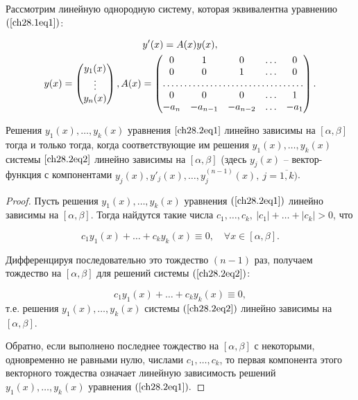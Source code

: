 Рассмотрим линейную однородную систему, которая эквивалентна уравнению $(\ref{ch28.1eq1})$:

\begin{multline} \label{ch28.2eq2}
y'(x) = A(x)y(x), \\
y(x) = \begin{pmatrix}
y_1(x) \\
\vdots \\
y_n(x)
\end{pmatrix},
A(x) = \begin{pmatrix}
0 & 1 & 0 & \ldots & 0 \\
0 & 0 & 1 & \ldots & 0 \\
\hdotsfor{5} \\
0 & 0 & 0 & \ldots & 1 \\
-a_n & -a_{n - 1} & -a_{n - 2} & \ldots & -a_1
\end{pmatrix}.
\end{multline}

\begin{lemm} \label{ch28.2lemm1}
Решения $y_1(x), \ldots, y_k(x)$ уравнения $\ref{ch28.2eq1}$ линейно зависимы на $[\alpha, \beta]$ тогда и только тогда, когда соответствующие им решения $y_1(x), \ldots, y_k(x)$ системы $\ref{ch28.2eq2}$ линейно зависимы на $[\alpha,\beta]$ (здесь $y_j(x)$ -- вектор-функция с компонентами $y_j(x), y'_j(x), \ldots, y^{(n - 1)}_j(x), \: j = \overline{1,k})$.
\end{lemm}

\begin{proof}
Пусть решения $y_1(x), \ldots, y_k(x)$ уравнения $(\ref{ch28.2eq1})$ линейно зависимы на $[\alpha, \beta]$. Тогда найдутся такие числа $c_1, \ldots, c_k, \: |c_1| + \ldots + |c_k| > 0$, что 

$$
c_1y_1(x) + \ldots + c_ky_k(x) \equiv 0, \quad \forall x \in [\alpha, \beta].
$$

Дифференцируя последовательно это тождество $(n - 1)$ раз, получаем тождество на $[\alpha, \beta]$ для решений системы $(\ref{ch28.2eq2})$:

$$
c_1y_1(x) + \ldots + c_ky_k(x) \equiv 0,
$$
т.е. решения $y_1(x), \ldots, y_k(x)$ системы $(\ref{ch28.2eq2})$ линейно зависимы на $[\alpha, \beta]$.

Обратно, если выполнено последнее тождество на $[\alpha, \beta]$ с некоторыми, одновременно не равными нулю, числами $c_1, \ldots, c_k$, то первая компонента этого векторного тождества означает линейную зависимость решений $y_1(x), \ldots, y_k(x)$ уравнения $(\ref{ch28.2eq1}).$
\end{proof}

